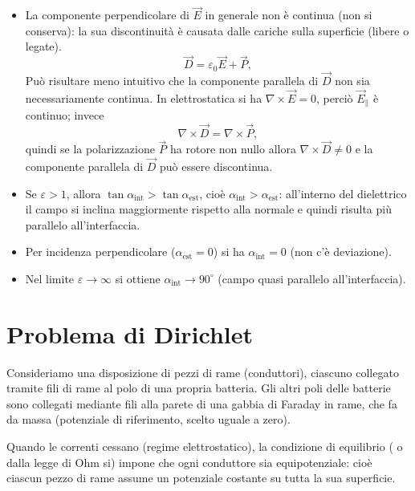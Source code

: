 \documentclass{book}
\begin{document}
\begin{itemize}
\item{La componente perpendicolare di \(\vec{E}\)  in generale non è continua (non si conserva): la sua discontinuità è causata dalle cariche sulla superficie (libere o legate). 
\[
\vec{D}=\varepsilon_0\vec{E}+\vec{P},
\]
Può risultare meno intuitivo che la componente parallela di \(\vec{D}\) non sia necessariamente continua. In elettrostatica si ha \(\nabla\times\vec{E}=0\), perciò \(\vec{E}_{\parallel}\) è continuo; invece
\[
\nabla\times\vec{D}=\nabla\times\vec{P},
\]
quindi se la polarizzazione \(\vec{P}\) ha rotore non nullo allora \(\nabla\times\vec{D}\neq 0\) e la componente parallela di \(\vec{D}\) può essere discontinua.}

  \item Se $\varepsilon>1$, allora $\tan\alpha_{\text{int}}>\tan\alpha_{\text{est}}$, cioè $\alpha_{\text{int}}>\alpha_{\text{est}}$: all'interno del dielettrico il campo si inclina maggiormente rispetto alla normale e quindi risulta più parallelo all'interfaccia.
  \item Per incidenza perpendicolare ($\alpha_{\text{est}}=0$) si ha $\alpha_{\text{int}}=0$ (non c'è deviazione).
  \item Nel limite $\varepsilon\to\infty$ si ottiene $\alpha_{\text{int}}\to 90^\circ$ (campo quasi parallelo all'interfaccia).
\end{itemize}


\section{Problema di Dirichlet}

Consideriamo una disposizione di pezzi di rame (conduttori), ciascuno collegato tramite fili di rame al polo di una propria batteria. Gli altri poli delle batterie sono collegati mediante fili alla parete di una gabbia di Faraday in rame, che fa da massa (potenziale di riferimento, scelto uguale a zero).

Quando le correnti cessano (regime elettrostatico), la condizione di equilibrio ( o dalla legge di Ohm si) impone che ogni conduttore sia equipotenziale: cioè ciascun pezzo di rame assume un potenziale costante su tutta la sua superficie.

\medskip
\end{document}
